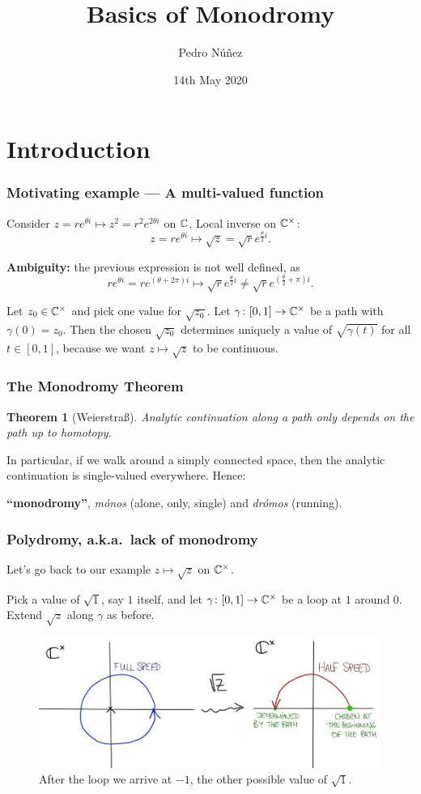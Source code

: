\documentclass[notheorems, hyperref={backref}]{beamer}
\title[Basics of monodromy]{Basics of Monodromy}
\author{Pedro Núñez}
\institute{Basic Notions --- University of Freiburg}
\date{14th May 2020}
\newtheorem*{thm}{Theorem}
\begin{document}
 
\frame{\titlepage}

\section{Introduction}
\begin{frame}
    \frametitle{Motivating example --- A multi-valued function}
    Consider $z=re^{\theta i}\mapsto z^{2}=r^{2}e^{2\theta i}$ on $\mathbb{C}$.
    Local inverse on $\mathbb{C}^{\times}$:
    \[ z=re^{\theta i} \mapsto \sqrt{z}=\sqrt{r}e^{\frac{\theta}{2}i}. \]
    \pause

    \textbf{Ambiguity:} the previous expression is not well defined, as
    \[ re^{\theta i}=re^{(\theta+2\pi)i}\mapsto \sqrt{r}e^{\frac{\theta}{2}i}\neq \sqrt{r}e^{\left(\frac{\theta}{2}+\pi\right)i}. \]
    \pause

    Let $z_{0}\in \mathbb{C}^{\times}$ and pick one value for $\sqrt{z_{0}}$.
    Let $\gamma\colon [0,1]\to \mathbb{C}^{\times}$ be a path with $\gamma(0)=z_{0}$.
    Then the chosen $\sqrt{z_{0}}$ determines uniquely a value of $\sqrt{\gamma(t)}$ for all $t\in [0,1]$, because we want $z\mapsto \sqrt{z}$ to be continuous.
\end{frame}
 
\begin{frame}
    \frametitle{The Monodromy Theorem}
    \begin{thm}[Weierstraß]
	Analytic continuation along a path only depends on the path up to homotopy.
    \end{thm}
    \pause
    \vspace{2em}
    In particular, if we walk around a simply connected space, then the analytic continuation is single-valued everywhere.
    \pause
    \vspace{2em}
    Hence:
    
    \textbf{``monodromy''}, \textit{mónos} (alone, only, single) and \textit{drómos} (running).
\end{frame}

\begin{frame}
    \frametitle{Polydromy, a.k.a.~lack of monodromy}
    Let's go back to our example $z\mapsto \sqrt{z}$ on $\mathbb{C}^{\times}$.
    \pause

    Pick a value of $\sqrt{1}$, say $1$ itself, and let $\gamma\colon [0,1]\to \mathbb{C}^{\times}$ be a loop at $1$ around $0$.
    Extend $\sqrt{z}$ along $\gamma$ as before.
    \pause
    \begin{figure}[htp]
	\centering
	\includegraphics[scale=.3]{pictures/root.jpg}
	\caption{After the loop we arrive at $-1$, the other possible value of $\sqrt{1}$.}
    \end{figure}
\end{frame}
\end{document}
